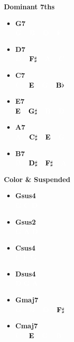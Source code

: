 \documentclass[a4paper,landscape]{article}
\newcommand{\noteBadge}[3]{%
    \colorbox{#1}{\textcolor{#2}{\textbf{#3}}}%
}
\begin{document}
\begin{multicols}{4}
\noindent
\textbf{Dominant 7ths}
\begin{itemize}
    \item \textbf{G7} \\
          \noteBadge{colorG}{white}{G} \ \noteBadge{colorB}{white}{B} \ \noteBadge{colorD}{white}{D} \ \noteBadge{colorF}{white}{F}
    \item \textbf{D7} \\
          \noteBadge{colorD}{white}{D} \ \noteBadge{colorFs}{black}{F$\sharp$} \ \noteBadge{colorA}{white}{A} \ \noteBadge{colorC}{white}{C}
    \item \textbf{C7} \\
          \noteBadge{colorC}{white}{C} \ \noteBadge{colorE}{black}{E} \ \noteBadge{colorG}{white}{G} \ \noteBadge{colorAs}{black}{B$\flat$}
    \item \textbf{E7} \\
          \noteBadge{colorE}{black}{E} \ \noteBadge{colorGs}{black}{G$\sharp$} \ \noteBadge{colorB}{white}{B} \ \noteBadge{colorD}{white}{D}
    \item \textbf{A7} \\
          \noteBadge{colorA}{white}{A} \ \noteBadge{colorCs}{black}{C$\sharp$} \ \noteBadge{colorE}{black}{E} \ \noteBadge{colorG}{white}{G}
    \item \textbf{B7} \\
          \noteBadge{colorB}{white}{B} \ \noteBadge{colorDs}{black}{D$\sharp$} \ \noteBadge{colorFs}{black}{F$\sharp$} \ \noteBadge{colorA}{white}{A}
\end{itemize}

\columnbreak

\noindent
\textbf{Color \& Suspended}
\begin{itemize}
    \item \textbf{Gsus4} \\
          \noteBadge{colorG}{white}{G} \quad \noteBadge{colorC}{white}{C} \quad \noteBadge{colorD}{white}{D}
    \item \textbf{Gsus2} \\
          \noteBadge{colorG}{white}{G} \quad \noteBadge{colorA}{white}{A} \quad \noteBadge{colorD}{white}{D}
    \item \textbf{Csus4} \\
          \noteBadge{colorC}{white}{C} \quad \noteBadge{colorF}{white}{F} \quad \noteBadge{colorG}{white}{G}
    \item \textbf{Dsus4} \\
          \noteBadge{colorD}{white}{D} \quad \noteBadge{colorG}{white}{G} \quad \noteBadge{colorA}{white}{A}
    \item \textbf{Gmaj7} \\
          \noteBadge{colorG}{white}{G} \ \noteBadge{colorB}{white}{B} \ \noteBadge{colorD}{white}{D} \ \noteBadge{colorFs}{black}{F$\sharp$}
    \item \textbf{Cmaj7} \\
          \noteBadge{colorC}{white}{C} \ \noteBadge{colorE}{black}{E} \ \noteBadge{colorG}{white}{G} \ \noteBadge{colorB}{white}{B}
\end{itemize}

\end{multicols}
\end{document}
